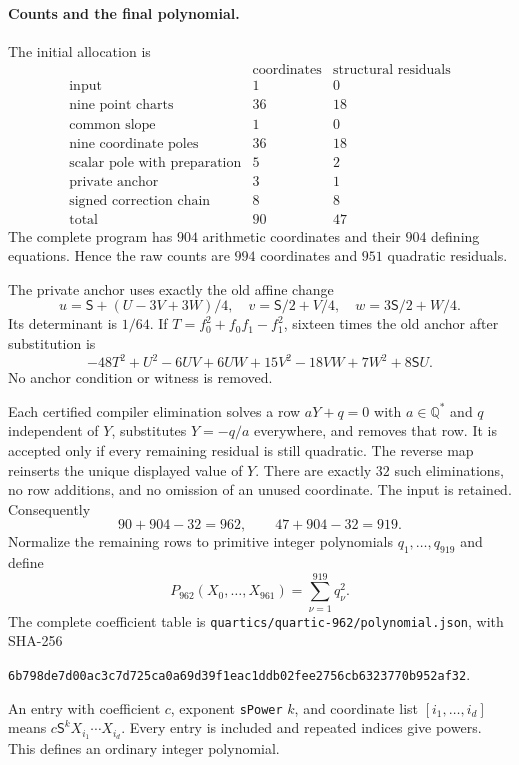\documentclass[11pt]{article}
\theoremstyle{definition}
\theoremstyle{remark}
\newcommand{\Q}{\mathbb Q}
\begin{document}
\paragraph{Counts and the final polynomial.}
The initial allocation is
\[
\begin{array}{l|r|r}
 &\text{coordinates}&\text{structural residuals}\\\hline
 \text{input}&1&0\\
 \text{nine point charts}&36&18\\
 \text{common slope}&1&0\\
 \text{nine coordinate poles}&36&18\\
 \text{scalar pole with preparation}&5&2\\
 \text{private anchor}&3&1\\
 \text{signed correction chain}&8&8\\\hline
 \text{total}&90&47
\end{array}
\]
The complete program has $904$ arithmetic coordinates and their
$904$ defining equations. Hence the raw counts are $994$ coordinates
and $951$ quadratic residuals.

The private anchor uses exactly the old affine change
\[
 u=\mathsf S+(U-3V+3W)/4,\quad
 v=\mathsf S/2+V/4,\quad w=3\mathsf S/2+W/4.
\]
Its determinant is $1/64$. If $T=f_0^2+f_0f_1-f_1^2$, sixteen times
the old anchor after substitution is
\[
 -48T^2+U^2-6UV+6UW+15V^2-18VW+7W^2+8\mathsf S U.
\]
No anchor condition or witness is removed.

Each certified compiler elimination solves a row $aY+q=0$ with
$a\in\Q^*$ and $q$ independent of $Y$, substitutes $Y=-q/a$
everywhere, and removes that row. It is accepted only if every
remaining residual is still quadratic. The reverse map reinserts
the unique displayed value of $Y$. There are exactly $32$ such
eliminations, no row additions, and no omission of an unused coordinate.
The input is retained. Consequently
\[
 90+904-32=962,\qquad47+904-32=919.
\]
Normalize the remaining rows to primitive integer polynomials
$q_1,\ldots,q_{919}$ and define
\begin{equation}\label{eq:v6-final-polynomial}
 P_{962}(X_0,\ldots,X_{961})=\sum_{\nu=1}^{919}q_\nu^2.
\end{equation}
The complete coefficient table is
\nolinkurl{quartics/quartic-962/polynomial.json}, with SHA-256
\begin{center}\small
\nolinkurl{6b798de7d00ac3c7d725ca0a69d39f1eac1ddb02fee2756cb6323770b952af32}.
\end{center}
An entry with coefficient $c$, exponent \texttt{sPower} $k$, and
coordinate list $[i_1,\ldots,i_d]$ means
$c\mathsf S^kX_{i_1}\cdots X_{i_d}$. Every entry is included and repeated
indices give powers. This defines an ordinary integer polynomial.
\end{document}
